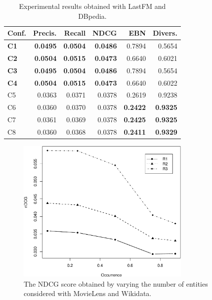 \begin{table}
\centering
\begin{tabular}{@{}lrrrrr@{}}
\toprule
Conf.       & Precis.         & Recall          & NDCG            & EBN             & Divers. \\ \midrule
\textbf{C1} & \textbf{0.0495} & \textbf{0.0504} & \textbf{0.0486} & 0.7894          & 0.5654  \\
\textbf{C2} & \textbf{0.0504} & \textbf{0.0515} & \textbf{0.0473} & 0.6640          & 0.6021  \\
\textbf{C3} & \textbf{0.0495} & \textbf{0.0504} & \textbf{0.0486} & 0.7894          & 0.5654  \\
\textbf{C4} & \textbf{0.0504} & \textbf{0.0515} & \textbf{0.0473} & 0.6640          & 0.6022  \\
C5          & 0.0363          & 0.0371          & 0.0378          & 0.2619          & 0.9238  \\
C6          & 0.0360          & 0.0370          & 0.0378          & \textbf{0.2422} & \textbf{0.9325}  \\
C7          & 0.0361          & 0.0369          & 0.0378          & \textbf{0.2425} & \textbf{0.9325}  \\
C8          & 0.0360          & 0.0368          & 0.0378          & \textbf{0.2411} & \textbf{0.9329} \\ \bottomrule
\end{tabular}
\caption[Experimental results with LastFM and DBpedia]{Experimental results obtained with LastFM and DBpedia.}
\label{srr:tab:ex1-fm}
\end{table}

\begin{figure}
\centering
\includegraphics[width=0.75\textwidth]{lineplot}
\caption[NDCG with MovieLens and Wikidata]{The NDCG score obtained by varying the number of entities considered with MovieLens and Wikidata.}
\label{srr:fig:lineplot}
\end{figure}


